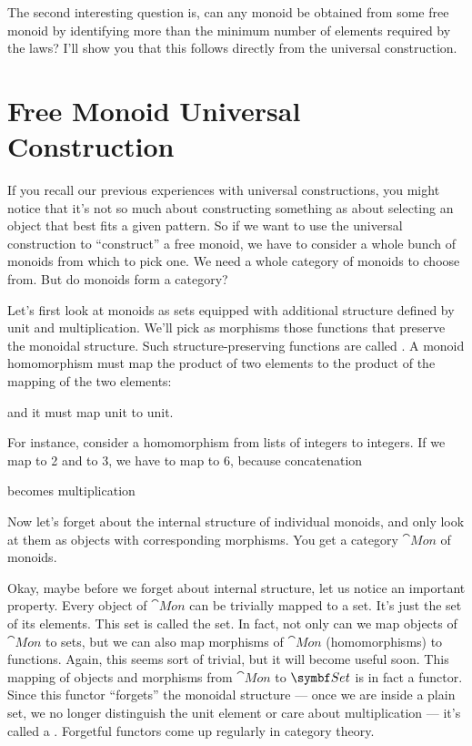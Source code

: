 The second interesting question is, can any monoid be obtained from some
free monoid by identifying more than the minimum number of elements
required by the laws? I'll show you that this follows directly from the
universal construction.

\section{Free Monoid Universal Construction}

If you recall our previous experiences with universal constructions, you
might notice that it's not so much about constructing something as about
selecting an object that best fits a given pattern. So if we want to use
the universal construction to ``construct'' a free monoid, we have to
consider a whole bunch of monoids from which to pick one. We need a
whole category of monoids to choose from. But do monoids form a category?

Let's first look at monoids as sets equipped with additional structure
defined by unit and multiplication. We'll pick as morphisms those
functions that preserve the monoidal structure. Such
structure-preserving functions are called . A monoid
homomorphism must map the product of two elements to the product of the
mapping of the two elements:

and it must map unit to unit.

For instance, consider a homomorphism from lists of integers to
integers. If we map \code{{[}2{]}} to 2 and \code{{[}3{]}} to 3, we
have to map \code{{[}2, 3{]}} to 6, because concatenation

becomes multiplication

Now let's forget about the internal structure of individual monoids, and
only look at them as objects with corresponding morphisms. You get a
category $\cat{Mon}$ of monoids.

Okay, maybe before we forget about internal structure, let us notice an
important property. Every object of $\cat{Mon}$ can be trivially mapped
to a set. It's just the set of its elements. This set is called the
 set. In fact, not only can we map objects of
$\cat{Mon}$ to sets, but we can also map morphisms of $\cat{Mon}$
(homomorphisms) to functions. Again, this seems sort of trivial, but it
will become useful soon. This mapping of objects and morphisms from
$\cat{Mon}$ to $\Set$ is in fact a functor. Since this functor
``forgets'' the monoidal structure --- once we are inside a plain set,
we no longer distinguish the unit element or care about multiplication
--- it's called a . Forgetful functors come up
regularly in category theory.

